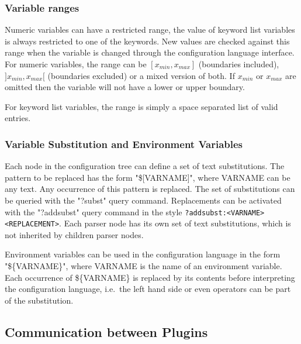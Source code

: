\subsubsection{Variable ranges}

Numeric variables can have a restricted range, the value of keyword list 
variables is always restricted to one of the keywords. New values are checked 
against this range when the variable is changed through the \mha{} configuration 
language interface. For numeric variables, the range can be 
$[x_{min},x_{max}]$ (boundaries included), $]x_{min},x_{max}[$
(boundaries excluded) or a mixed version of both. If $x_{min}$ or
$x_{max}$ are omitted then the variable will not have a lower or
upper boundary.

For keyword list variables, the range is simply a space separated list of valid
entries.

\subsubsection{Variable Substitution and Environment
  Variables}

Each node in the \mha{} configuration tree can define a set of text
substitutions.  The pattern to be replaced has the form "\$[VARNAME]",
where VARNAME can be any text. Any occurrence of this pattern is
replaced. The set of substitutions can be queried with the "?subst"
query command. Replacements can be activated with the "?addsubst"
query command in the style
\verb!?addsubst:<VARNAME> <REPLACEMENT>!. Each parser node has its own
set of text substitutions, which is not inherited by children parser
nodes.

Environment variables can be used in the \mha{} configuration language in the form
"\$\{VARNAME\}", where VARNAME is the name of an environment variable. Each
occurrence of \$\{VARNAME\} is replaced by its contents before interpreting the
\mha{} configuration language, i.e.\ the left hand side or even operators can be part of
the substitution.

\subsection{Communication between \mha{} Plugins}

